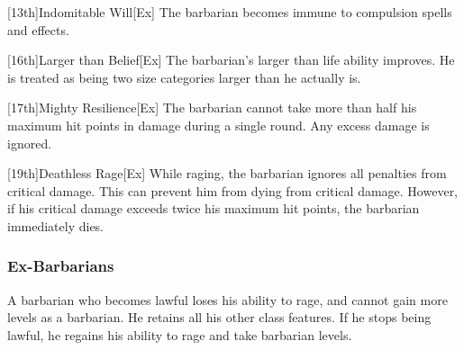 [13th]{Indomitable Will}[Ex]
The barbarian becomes immune to compulsion spells and effects.

[16th]{Larger than Belief}[Ex]
The barbarian's larger than life ability improves.
He is treated as being two size categories larger than he actually is.

[17th]{Mighty Resilience}[Ex]
The barbarian cannot take more than half his maximum hit points in damage during a single round.
Any excess damage is ignored.

[19th]{Deathless Rage}[Ex]
While raging, the barbarian ignores all penalties from critical damage.
This can prevent him from dying from critical damage.
However, if his critical damage exceeds twice his maximum hit points, the barbarian immediately dies.

\subsubsection{Ex-Barbarians}
A barbarian who becomes lawful loses his ability to rage, and cannot gain more levels as a barbarian.
He retains all his other class features.
If he stops being lawful, he regains his ability to rage and take barbarian levels.

